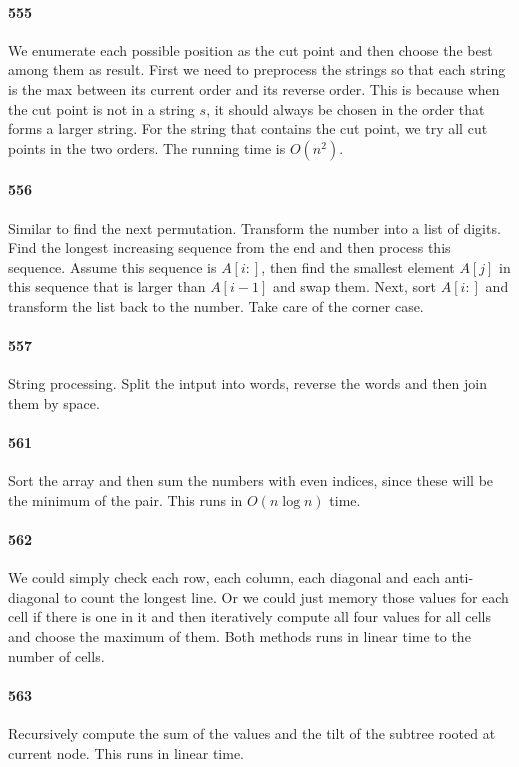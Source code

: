 \documentclass[11pt]{article}
\begin{document}
\paragraph{555}
We enumerate each possible position as the cut point and then choose the best among them as result. 
First we need to preprocess the strings so that each string is the max between its current order and its reverse order.
This is because when the cut point is not in a string $s$, it should always be chosen in the order that forms a larger string.
For the string that contains the cut point, we try all cut points in the two orders. The running time is $O(n^2)$. 

\paragraph{556}
Similar to find the next permutation. Transform the number into a list of digits. 
Find the longest increasing sequence from the end and then process this sequence.
Assume this sequence is $A[i:]$, then find the smallest element $A[j]$ in this sequence that is larger than $A[i-1]$ and swap
them. Next, sort $A[i:]$ and transform the list back to the number. Take care of the corner case.

\paragraph{557}
String processing. Split the intput into words, reverse the words and then join them by space.

\paragraph{561}
Sort the array and then sum the numbers with even indices, since these will be the minimum of the pair. 
This runs in $O(n \log n)$ time.

\paragraph{562}
We could simply check each row, each column, each diagonal and each anti-diagonal to count the longest line. Or we could just
memory those values for each cell if there is one in it and then iteratively compute all four values for all cells and choose
the maximum of them. Both methods runs in linear time to the number of cells.

\paragraph{563}
Recursively compute the sum of the values and the tilt of the subtree rooted at current node. This runs in linear time.
\end{document}
